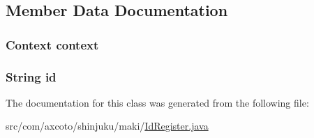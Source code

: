 \subsection{\-Member \-Data \-Documentation}
\hypertarget{classcom_1_1axcoto_1_1shinjuku_1_1maki_1_1_id_register_af73e715b5b0bbc5ea42336c758ceda5f}{
\subsubsection[{context}]{\setlength{\rightskip}{0pt plus 5cm}\-Context {\bf context}}}\label{classcom_1_1axcoto_1_1shinjuku_1_1maki_1_1_id_register_af73e715b5b0bbc5ea42336c758ceda5f}
\hypertarget{classcom_1_1axcoto_1_1shinjuku_1_1maki_1_1_id_register_a76010eef1edc0406cc2375c25d2a433d}{
\subsubsection[{id}]{\setlength{\rightskip}{0pt plus 5cm}\-String {\bf id}}}\label{classcom_1_1axcoto_1_1shinjuku_1_1maki_1_1_id_register_a76010eef1edc0406cc2375c25d2a433d}


\-The documentation for this class was generated from the following file\-:\begin{DoxyCompactItemize}
\item 
src/com/axcoto/shinjuku/maki/\hyperlink{_id_register_8java}{\-Id\-Register.\-java}\end{DoxyCompactItemize}
